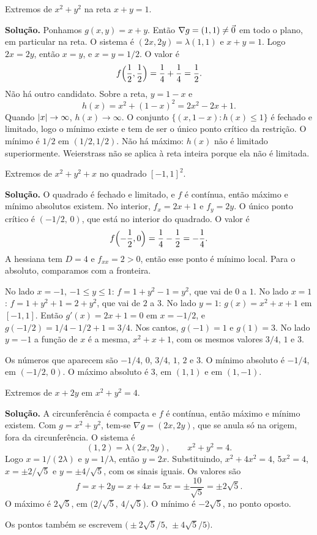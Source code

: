 \documentclass[11pt,a4paper]{article}
\begin{document}
\begin{exercicio}
Extremos de $x^2+y^2$ na reta $x+y=1$.

\textbf{Solução.}
Ponhamos $g(x,y)=x+y$. Então $\nabla g=(1,1)\neq\vec{0}$ em todo o plano, em particular na reta. O sistema é $(2x,2y)=\lambda(1,1)$ e $x+y=1$. Logo $2x=2y$, então $x=y$, e $x=y=1/2$. O valor é
\[
f\Bigl(\frac12,\frac12\Bigr)=\frac14+\frac14=\frac12.
\]
Não há outro candidato. Sobre a reta, $y=1-x$ e
\[
h(x)=x^2+(1-x)^2=2x^2-2x+1.
\]
Quando $\left\lvert x \right\rvert\to\infty$, $h(x)\to\infty$. O conjunto $\{(x,1-x):h(x)\le 1\}$ é fechado e limitado, logo o mínimo existe e tem de ser o único ponto crítico da restrição. O mínimo é $1/2$ em $(1/2,1/2)$. Não há máximo: $h(x)$ não é limitado superiormente. Weierstrass não se aplica à reta inteira porque ela não é limitada.
\end{exercicio}

\begin{exercicio}
Extremos de $x^2+y^2+x$ no quadrado $[-1,1]^2$.

\textbf{Solução.}
O quadrado é fechado e limitado, e $f$ é contínua, então máximo e mínimo absolutos existem. No interior, $f_x=2x+1$ e $f_y=2y$. O único ponto crítico é $(-1/2,\,0)$, que está no interior do quadrado. O valor é
\[
f\Bigl(-\frac12,0\Bigr)=\frac14-\frac12=-\frac14.
\]
A hessiana tem $D=4$ e $f_{xx}=2>0$, então esse ponto é mínimo local. Para o absoluto, comparamos com a fronteira.

No lado $x=-1$, $-1\le y\le 1$: $f=1+y^2-1=y^2$, que vai de $0$ a $1$.
No lado $x=1$: $f=1+y^2+1=2+y^2$, que vai de $2$ a $3$.
No lado $y=1$: $g(x)=x^2+x+1$ em $[-1,1]$. Então $g'(x)=2x+1=0$ em $x=-1/2$, e $g(-1/2)=1/4-1/2+1=3/4$. Nos cantos, $g(-1)=1$ e $g(1)=3$.
No lado $y=-1$ a função de $x$ é a mesma, $x^2+x+1$, com os mesmos valores $3/4$, $1$ e $3$.

Os números que aparecem são $-1/4$, $0$, $3/4$, $1$, $2$ e $3$. O mínimo absoluto é $-1/4$, em $(-1/2,\,0)$. O máximo absoluto é $3$, em $(1,1)$ e em $(1,-1)$.
\end{exercicio}

\begin{exercicio}
Extremos de $x+2y$ em $x^2+y^2=4$.

\textbf{Solução.}
A circunferência é compacta e $f$ é contínua, então máximo e mínimo existem. Com $g=x^2+y^2$, tem-se $\nabla g=(2x,2y)$, que se anula só na origem, fora da circunferência. O sistema é
\[
(1,2)=\lambda(2x,2y),\qquad x^2+y^2=4.
\]
Logo $x=1/(2\lambda)$ e $y=1/\lambda$, então $y=2x$. Substituindo, $x^2+4x^2=4$, $5x^2=4$, $x=\pm 2/\sqrt{5}$ e $y=\pm 4/\sqrt{5}$, com os sinais iguais. Os valores são
\[
f=x+2y=x+4x=5x=\pm\frac{10}{\sqrt{5}}=\pm 2\sqrt{5}.
\]
O máximo é $2\sqrt{5}$, em $\bigl(2/\sqrt{5},\,4/\sqrt{5}\bigr)$. O mínimo é $-2\sqrt{5}$, no ponto oposto.

Os pontos também se escrevem $\bigl(\pm 2\sqrt{5}/5,\,\pm 4\sqrt{5}/5\bigr)$.
\end{exercicio}
\end{document}

